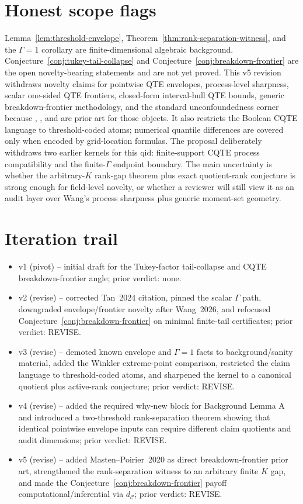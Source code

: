 \documentclass[11pt]{article}
\theoremstyle{definition}
\theoremstyle{plain}
\theoremstyle{remark}
\begin{document}
\section{Honest scope flags}
Lemma~\ref{lem:threshold-envelope}, Theorem~\ref{thm:rank-separation-witness}, and the \(\Gamma=1\) corollary are finite-dimensional algebraic background.  Conjecture~\ref{conj:tukey-tail-collapse} and Conjecture~\ref{conj:breakdown-frontier} are the open novelty-bearing statements and are not yet proved.  This v5 revision withdraws novelty claims for pointwise QTE envelopes, process-level sharpness, scalar one-sided QTE frontiers, closed-form interval-hull QTE bounds, generic breakdown-frontier methodology, and the standard unconfoundedness corner because \citet{MastenPoirier2020}, \citet{Wang2026}, and \citet{Firpo2007} are prior art for those objects.  It also restricts the Boolean CQTE language to threshold-coded atoms; numerical quantile differences are covered only when encoded by grid-location formulas.  The proposal deliberately withdraws two earlier kernels for this qid: finite-support CQTE process compatibility and the finite-\(\Gamma\) endpoint boundary.  The main uncertainty is whether the arbitrary-\(K\) rank-gap theorem plus exact quotient-rank conjecture is strong enough for field-level novelty, or whether a reviewer will still view it as an audit layer over Wang's process sharpness plus generic moment-set geometry.

\section{Iteration trail}
\begin{itemize}[leftmargin=*]
\item v1 (pivot) -- initial draft for the Tukey-factor tail-collapse and CQTE breakdown-frontier angle; prior verdict: none.
\item v2 (revise) -- corrected Tan~2024 citation, pinned the scalar \(\Gamma\) path, downgraded envelope/frontier novelty after Wang~2026, and refocused Conjecture~\ref{conj:breakdown-frontier} on minimal finite-tail certificates; prior verdict: REVISE.
\item v3 (revise) -- demoted known envelope and \(\Gamma=1\) facts to background/sanity material, added the Winkler extreme-point comparison, restricted the claim language to threshold-coded atoms, and sharpened the kernel to a canonical quotient plus active-rank conjecture; prior verdict: REVISE.
\item v4 (revise) -- added the required why-new block for Background Lemma A and introduced a two-threshold rank-separation theorem showing that identical pointwise envelope inputs can require different claim quotients and audit dimensions; prior verdict: REVISE.
\item v5 (revise) -- added Masten--Poirier~2020 as direct breakdown-frontier prior art, strengthened the rank-separation witness to an arbitrary finite \(K\) gap, and made the Conjecture~\ref{conj:breakdown-frontier} payoff computational/inferential via \(d_{\mathcal{C}}\); prior verdict: REVISE.
\end{itemize}
\end{document}
